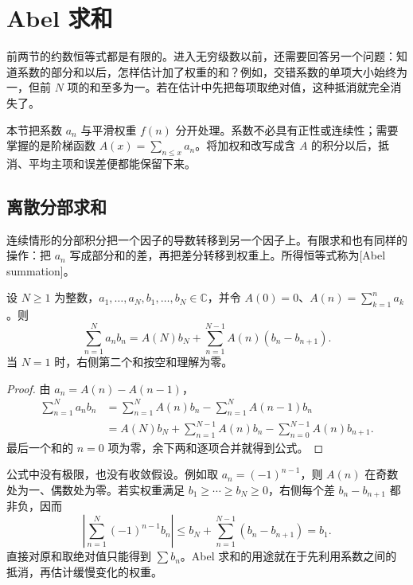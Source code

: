 \section{Abel 求和}
\label{b3:sec:2503}

前两节的约数恒等式都是有限的。进入无穷级数以前，还需要回答另一个问题：知道系数的部分和以后，怎样估计加了权重的和？例如，交错系数的单项大小始终为一，但前 \(N\) 项的和至多为一。若在估计中先把每项取绝对值，这种抵消就完全消失了。

本节把系数 \(a_n\) 与平滑权重 \(f(n)\) 分开处理。系数不必具有正性或连续性；需要掌握的是阶梯函数 \(A(x)=\sum_{n\le x}a_n\)。将加权和改写成含 \(A\) 的积分以后，抵消、平均主项和误差便都能保留下来。

\subsection{离散分部求和}
\label{b3:subsec:250301}

连续情形的分部积分把一个因子的导数转移到另一个因子上。有限求和也有同样的操作：把 \(a_n\) 写成部分和的差，再把差分转移到权重上。所得恒等式称为[Abel summation]。

\begin{proposition}\label{b3:prop:25-summation-by-parts}
设 \(N\ge1\) 为整数，\(a_1,\ldots,a_N,b_1,\ldots,b_N\in\mathbb C\)，并令 \(A(0)=0\)、\(A(n)=\sum_{k=1}^n a_k\)。则
\[
 \sum_{n=1}^N a_nb_n
 =A(N)b_N+\sum_{n=1}^{N-1}A(n)(b_n-b_{n+1}).
\]
当 \(N=1\) 时，右侧第二个和按空和理解为零。
\end{proposition}
\begin{proof}
由 \(a_n=A(n)-A(n-1)\)，
\begin{align*}
 \sum_{n=1}^N a_nb_n
 &=\sum_{n=1}^N A(n)b_n-\sum_{n=1}^N A(n-1)b_n\\
 &=A(N)b_N+\sum_{n=1}^{N-1}A(n)b_n
                 -\sum_{n=0}^{N-1}A(n)b_{n+1}.
\end{align*}
最后一个和的 \(n=0\) 项为零，余下两和逐项合并就得到公式。
\end{proof}

公式中没有极限，也没有收敛假设。例如取 \(a_n=(-1)^{n-1}\)，则 \(A(n)\) 在奇数处为一、偶数处为零。若实权重满足 \(b_1\ge\cdots\ge b_N\ge0\)，右侧每个差 \(b_n-b_{n+1}\) 都非负，因而
\[
 \left|\sum_{n=1}^N(-1)^{n-1}b_n\right|
 \le b_N+\sum_{n=1}^{N-1}(b_n-b_{n+1})=b_1.
\]
直接对原和取绝对值只能得到 \(\sum b_n\)。Abel 求和的用途就在于先利用系数之间的抵消，再估计缓慢变化的权重。

